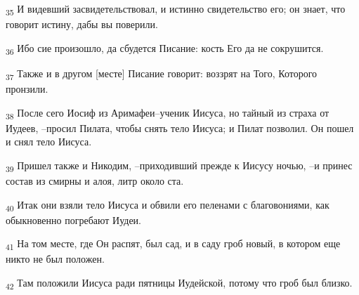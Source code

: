 \begin{tcolorbox}
\textsubscript{35} И видевший засвидетельствовал, и истинно свидетельство его; он знает, что говорит истину, дабы вы поверили.
\end{tcolorbox}
\begin{tcolorbox}
\textsubscript{36} Ибо сие произошло, да сбудется Писание: кость Его да не сокрушится.
\end{tcolorbox}
\begin{tcolorbox}
\textsubscript{37} Также и в другом [месте] Писание говорит: воззрят на Того, Которого пронзили.
\end{tcolorbox}
\begin{tcolorbox}
\textsubscript{38} После сего Иосиф из Аримафеи--ученик Иисуса, но тайный из страха от Иудеев, --просил Пилата, чтобы снять тело Иисуса; и Пилат позволил. Он пошел и снял тело Иисуса.
\end{tcolorbox}
\begin{tcolorbox}
\textsubscript{39} Пришел также и Никодим, --приходивший прежде к Иисусу ночью, --и принес состав из смирны и алоя, литр около ста.
\end{tcolorbox}
\begin{tcolorbox}
\textsubscript{40} Итак они взяли тело Иисуса и обвили его пеленами с благовониями, как обыкновенно погребают Иудеи.
\end{tcolorbox}
\begin{tcolorbox}
\textsubscript{41} На том месте, где Он распят, был сад, и в саду гроб новый, в котором еще никто не был положен.
\end{tcolorbox}
\begin{tcolorbox}
\textsubscript{42} Там положили Иисуса ради пятницы Иудейской, потому что гроб был близко.
\end{tcolorbox}
